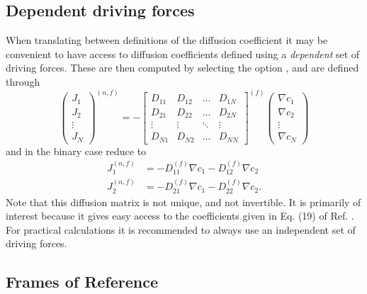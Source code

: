 \subsection{Dependent driving forces}
When translating between definitions of the diffusion coefficient it may be convenient to have access to diffusion coefficients defined using a \textit{dependent} set of driving forces. These are then computed by selecting the option , and are defined through
\begin{equation}
    \begin{pmatrix}J_1 \\ J_2 \\ \vdots \\ J_N \end{pmatrix}^{(n, f)} = -
    \begin{bmatrix}
    D_{11} & D_{12} & \hdots & D_{1N} \\
    D_{21} & D_{22} & \hdots & D_{2N} \\
    \vdots & \vdots & \ddots & \vdots \\
    D_{N1} & D_{N2} & \hdots & D_{NN}
    \end{bmatrix}^{(f)}
    \begin{pmatrix}\nabla c_1 \\ \nabla c_2 \\ \vdots \\ \nabla c_N \end{pmatrix}
\end{equation}
and in the binary case reduce to
\begin{equation}
    \begin{split}
        J_1^{(n, f)} &= - D_{11}^{(f)} \nabla c_1 - D_{12}^{(f)} \nabla c_2 \\
        J_2^{(n, f)} &= - D_{21}^{(f)} \nabla c_1 - D_{22}^{(f)} \nabla c_2.
    \end{split}
\end{equation}
Note that this diffusion matrix is not unique, and not invertible. It is primarily of interest because it gives easy access to the coefficients given in Eq. (19) of Ref. \cite{retmie}. For practical calculations it is recommended to always use an independent set of driving forces.

\subsection{Frames of Reference}

